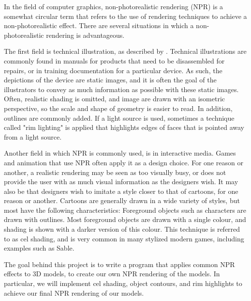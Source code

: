 In the field of computer graphics, non-photorealistic rendering (NPR) is a somewhat circular term that 
refers to the use of rendering techniques to achieve a non-photorealistic effect. There are several situations in which a non-photorealistic rendering is advantageous. 

The first field is technical illustration, as described by \cite{gooch98}. Technical illustrations are commonly found
in manuals for products that need to be disassembled for repairs, or in training documentation for a 
particular device. As such, the depictions of the device are static images, and it is often the goal of
the illustrators to convey as much information as possible with these static images. Often, realistic
shading is omitted, and image are drawn with an isometric perspective, so the scale and shape of 
geometry is easier to read. In addition, outlines are commonly added. If a light source is used, 
sometimes a technique called "rim lighting" is applied that highlights edges of faces that is pointed 
away from a light source.

Another field in which NPR is commonly used, is in interactive media. Games and animation that use NPR
often apply it as a design choice. For one reason or another, a realistic rendering may be seen as
too visually busy, or does not provide the user with as much visual information as the designers wish.
It may also be that designers wish to imitate a style closer to that of cartoons, for one reason or 
another. Cartoons are generally drawn in a wide variety of styles, but most have the following 
characteristics: Foreground objects such as characters are drawn with outlines. Most foreground objects
are drawn with a single colour, and shading is shown with a darker version of this colour. This 
technique is referred to as cel shading, and is very common in many stylized modern games, including
examples such as Sable.

The goal behind this project is to write a program that applies common NPR effects to 3D models, to 
create our own NPR rendering of the models. In particular, we will implement cel shading, object 
contours, and rim highlights to achieve our final NPR rendering of our models. 
